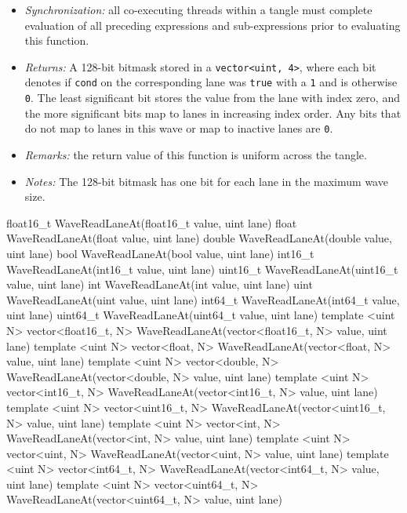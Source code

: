 \begin{itemize}
  \item \textit{Synchronization:} all co-executing threads within a \gls{tangle}
  must complete evaluation of all preceding expressions and sub-expressions
  prior to evaluating this function.
  \item \textit{Returns:} A 128-bit bitmask stored in a \texttt{vector<uint,
  4>}, where each bit denotes if \texttt{cond} on the corresponding \gls{lane}
  was \texttt{true} with a \texttt{1} and is otherwise \texttt{0}. The least
  significant bit stores the value from the \gls{lane} with index zero, and the
  more significant bits map to \gls{lane}s in increasing index order. Any bits
  that do not map to \gls{lane}s in this \gls{wave} or map to inactive
  \gls{lane}s are \texttt{0}.
  \item \textit{Remarks:} the return value of this function is uniform across
  the \gls{tangle}.
  \item \textit{Notes:} The 128-bit bitmask has one bit for each \gls{lane} in
  the maximum \gls{wave} size.
\end{itemize}

\begin{HLSL}
float16_t WaveReadLaneAt(float16_t value, uint lane)
float WaveReadLaneAt(float value, uint lane)
double WaveReadLaneAt(double value, uint lane)
bool WaveReadLaneAt(bool value, uint lane)
int16_t WaveReadLaneAt(int16_t value, uint lane)
uint16_t WaveReadLaneAt(uint16_t value, uint lane)
int WaveReadLaneAt(int value, uint lane)
uint WaveReadLaneAt(uint value, uint lane)
int64_t WaveReadLaneAt(int64_t value, uint lane)
uint64_t WaveReadLaneAt(uint64_t value, uint lane)
template <uint N> vector<float16_t, N> WaveReadLaneAt(vector<float16_t, N> value, uint lane)
template <uint N> vector<float, N> WaveReadLaneAt(vector<float, N> value, uint lane)
template <uint N> vector<double, N> WaveReadLaneAt(vector<double, N> value, uint lane)
template <uint N> vector<int16_t, N> WaveReadLaneAt(vector<int16_t, N> value, uint lane)
template <uint N> vector<uint16_t, N> WaveReadLaneAt(vector<uint16_t, N> value, uint lane)
template <uint N> vector<int, N> WaveReadLaneAt(vector<int, N> value, uint lane)
template <uint N> vector<uint, N> WaveReadLaneAt(vector<uint, N> value, uint lane)
template <uint N> vector<int64_t, N> WaveReadLaneAt(vector<int64_t, N> value, uint lane)
template <uint N> vector<uint64_t, N> WaveReadLaneAt(vector<uint64_t, N> value, uint lane)
\end{HLSL}

